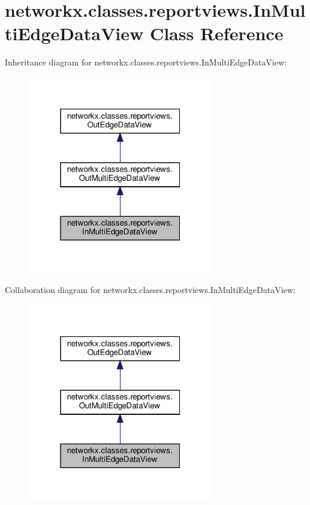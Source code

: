 \hypertarget{classnetworkx_1_1classes_1_1reportviews_1_1InMultiEdgeDataView}{}\section{networkx.\+classes.\+reportviews.\+In\+Multi\+Edge\+Data\+View Class Reference}
\label{classnetworkx_1_1classes_1_1reportviews_1_1InMultiEdgeDataView}


Inheritance diagram for networkx.\+classes.\+reportviews.\+In\+Multi\+Edge\+Data\+View\+:
\nopagebreak
\begin{figure}[H]
\begin{center}
\leavevmode
\includegraphics[width=229pt]{classnetworkx_1_1classes_1_1reportviews_1_1InMultiEdgeDataView__inherit__graph}
\end{center}
\end{figure}


Collaboration diagram for networkx.\+classes.\+reportviews.\+In\+Multi\+Edge\+Data\+View\+:
\nopagebreak
\begin{figure}[H]
\begin{center}
\leavevmode
\includegraphics[width=229pt]{classnetworkx_1_1classes_1_1reportviews_1_1InMultiEdgeDataView__coll__graph}
\end{center}
\end{figure}
